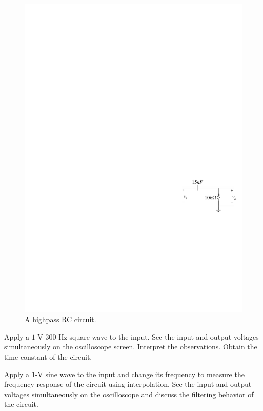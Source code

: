 \documentclass[11pt]{article}
\begin{document}

\begin{question}


\begin{figure}[H]
\centering
\includegraphics[scale=1.2,angle=0]{Fig/cir3.pdf}
\caption{A highpass RC circuit.} \label{fig:cir3}
\end{figure}

\begin{subquestion}{Apply a $1$-V $300$-Hz square wave to the input. See the input and output voltages simultaneously on the oscilloscope screen. Interpret the observations. Obtain the time constant of the circuit.} 
\answer{}
\end{subquestion}

\begin{subquestion}{Apply a $1$-V sine wave to the input and change its frequency to measure the frequency response of the circuit using interpolation. See the input and output voltages simultaneously on the oscilloscope and discuss the filtering behavior of the circuit.} 
\answer{}
\end{subquestion}


\end{question}
\end{document}
